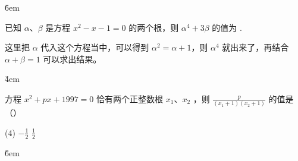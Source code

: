 \v{6em}

\begin{example}
    已知 $\alpha$、$\beta$ 是方程 $x^2-x-1=0$ 的两个根，则 $\alpha^4+3 \beta$ 的值为 \underline{\qquad}.
\end{example}

\begin{solution}
    这里把 $\alpha$ 代入这个方程当中，可以得到 $\alpha^2=\alpha+1$，则 $\alpha^4$ 就出来了，再结合 $\alpha + \beta = 1$ 可以求出结果。
\end{solution}

\v{4em}

\begin{example}
    方程 $x^2+p x+1997=0$ 恰有两个正整数根 $x_1$、$x_2$ ，则 $\frac{p}{\left(x_1+1\right)\left(x_2+1\right)}$ 的值是 （\qquad）
    \begin{tasks}(4)
        \task $-\frac{1}{2}$
        \task $\frac{1}{2}$
    \end{tasks}
\end{example}

\v{6em}